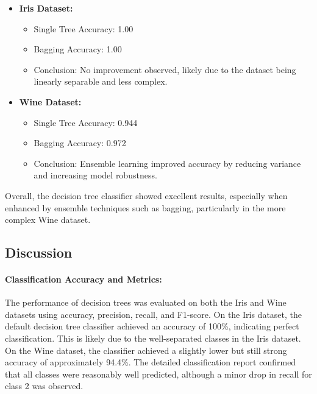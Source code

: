\documentclass[a4paper,12pt]{article}
\begin{document}
\begin{itemize}
    \item \textbf{Iris Dataset:}
    \begin{itemize}
        \item Single Tree Accuracy: 1.00
        \item Bagging Accuracy: 1.00
        \item Conclusion: No improvement observed, likely due to the dataset being linearly separable and less complex.
    \end{itemize}

    \item \textbf{Wine Dataset:}
    \begin{itemize}
        \item Single Tree Accuracy: 0.944
        \item Bagging Accuracy: 0.972
        \item Conclusion: Ensemble learning improved accuracy by reducing variance and increasing model robustness.
    \end{itemize}
\end{itemize}

Overall, the decision tree classifier showed excellent results, especially when enhanced by ensemble techniques such as bagging, particularly in the more complex Wine dataset.


\subsection{Discussion}

\paragraph{Classification Accuracy and Metrics:}
The performance of decision trees was evaluated on both the Iris and Wine datasets using accuracy, precision, recall, and F1-score. On the Iris dataset, the default decision tree classifier achieved an accuracy of 100\%, indicating perfect classification. This is likely due to the well-separated classes in the Iris dataset. On the Wine dataset, the classifier achieved a slightly lower but still strong accuracy of approximately 94.4\%. The detailed classification report confirmed that all classes were reasonably well predicted, although a minor drop in recall for class 2 was observed.
\end{document}
